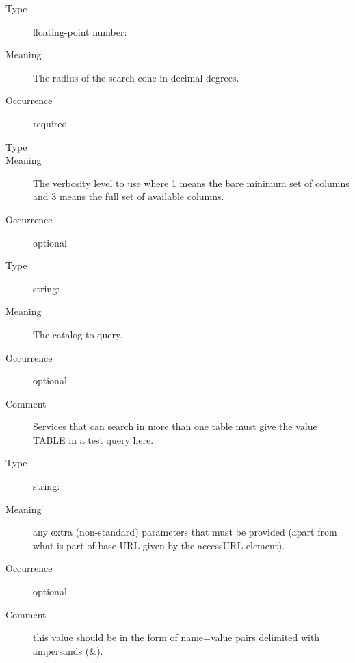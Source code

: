 \documentclass[11pt,a4paper]{ivoa}
\begin{document}
\begin{generated}
\begin{bigdescription}
\begin{description}
\end{description}
\item[Element \xmlel{sr}]
\begin{description}
\item[Type] floating-point number: 
\item[Meaning] The radius of the search cone in decimal degrees.
\item[Occurrence] required

\end{description}
\item[Element \xmlel{verb}]
\begin{description}
\item[Type] 
\item[Meaning] The verbosity level to use where 1 means the bare
                   minimum set of columns and 3 means the full set of
                   available columns.
\item[Occurrence] optional

\end{description}
\item[Element \xmlel{catalog}]
\begin{description}
\item[Type] string: 
\item[Meaning] The catalog to query.
\item[Occurrence] optional
\item[Comment] Services that can search in more than one table
                   must give the value TABLE in a test query here.

\end{description}
\item[Element \xmlel{extras}]
\begin{description}
\item[Type] string: 
\item[Meaning] any extra (non-standard) parameters that must be
                   provided (apart from what is part of base URL given
                   by the accessURL element).
\item[Occurrence] optional
\item[Comment] this value should be in the form of name=value
                   pairs delimited with ampersands (\&).

\end{description}


\end{bigdescription}\endgroup

\endgroup
\end{generated}
\end{document}
